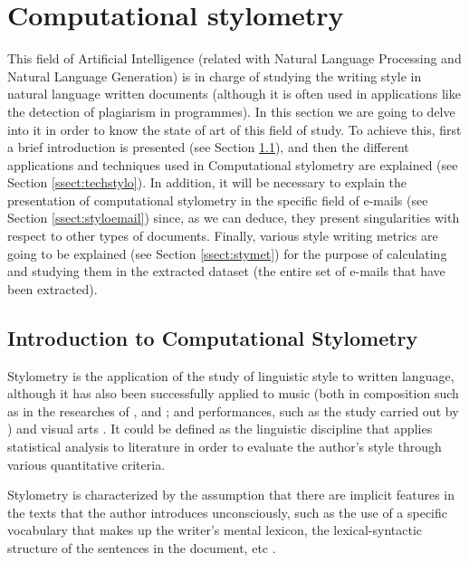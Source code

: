 \section{Computational stylometry}\label{sect:compstyl}
This field of Artificial Intelligence (related with Natural Language Processing and Natural Language Generation) is in charge of studying the writing style in natural language written documents (although it is often used in applications like the detection of plagiarism in programmes). In this section we are going to delve into it in order to know the state of art of this field of study. To achieve this, first a brief introduction is presented (see Section \ref{ssect:introstylo}), and then the different applications and techniques used in Computational stylometry are explained (see Section \ref{ssect:techstylo}). In addition, it will be necessary to explain the presentation of computational stylometry in the specific field of e-mails (see Section \ref{ssect:styloemail}) since, as we can deduce, they present singularities with respect to other types of documents. Finally, various style writing metrics are going to be explained (see Section \ref{ssect:stymet}) for the purpose of calculating and studying them in the extracted dataset (the entire set of e-mails that have been extracted).

\subsection{Introduction to Computational Stylometry}\label{ssect:introstylo}
Stylometry \citep{hughes2012quantitative} is the application of the study of linguistic style to written language, although it has also been successfully applied to music (both in composition such as in the researches of \cite{manaris2005zipf}, \cite{casey2008analysis} and \cite{huron1991ramp}; and performances, such as the study carried out by \cite{sapp2008hybrid}) and visual arts \citep{taylor1999fractal, hughes2010quantification}. It could be defined as the linguistic discipline that applies statistical analysis to literature in order to evaluate the author's style through various quantitative criteria.

Stylometry is characterized by the assumption that there are implicit features in the texts that the author introduces unconsciously, such as the use of a specific vocabulary that makes up the writer's mental lexicon, the lexical-syntactic structure of the sentences in the document, etc \citep{burrows1992computers}.


